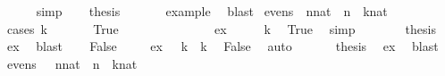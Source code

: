 \begin{isabellebody}
\ \ \ \ \isamarkupfalse%
\ simp\isanewline
\ \ \isamarkupfalse%
\ {\isacharquery}{\kern0pt}thesis\ \isanewline
\ \ \ \ \isamarkupfalse%
\ example\ \isamarkupfalse%
\ blast\isanewline
{}\isamarkupfalse%
%
\endisatagproof
{\isafoldproof}%
%
\isadelimproof
\isanewline
%
\endisadelimproof
\isanewline
{}\isamarkupfalse%
\ {\isachardoublequoteopen}evens{}{\isachardoublequoteclose}{\isacharcolon}{\kern0pt}\ {\isachardoublequoteopen}{\isasymexists}\ {\isacharparenleft}{\kern0pt}n{\isacharcolon}{\kern0pt}{\isacharcolon}{\kern0pt}nat{\isacharparenright}{\kern0pt}\ {\isachardot}{\kern0pt}\ {}{\isacharasterisk}{\kern0pt}n\ {\isachargreater}{\kern0pt}\ {\isacharparenleft}{\kern0pt}k{\isacharcolon}{\kern0pt}{\isacharcolon}{\kern0pt}nat{\isacharparenright}{\kern0pt}{\isachardoublequoteclose}\isanewline
%
\isadelimproof
%
\endisadelimproof
%
\isatagproof
{}\isamarkupfalse%
\ {\isacharparenleft}{\kern0pt}cases\ {\isachardoublequoteopen}k\ {\isacharequal}{\kern0pt}\ {}{\isachardoublequoteclose}{\isacharparenright}{\kern0pt}\ \isanewline
\ \ \isamarkupfalse%
\ True\ \ \ \ \ \ \ \ \ \ \ \isanewline
\ \ \isamarkupfalse%
\ ex{\isacharcolon}{\kern0pt}\ {\isachardoublequoteopen}\ {}\ {\isacharasterisk}{\kern0pt}\ {}\ {\isachargreater}{\kern0pt}\ k{\isachardoublequoteclose}\ \isamarkupfalse%
\ True\ \isamarkupfalse%
\ simp\ \ \isanewline
\ \ \isamarkupfalse%
\ \isamarkupfalse%
\ {\isacharquery}{\kern0pt}thesis\ \isamarkupfalse%
\ ex\ \isamarkupfalse%
\ blast\isanewline
{}\isamarkupfalse%
\isanewline
\ \ \isamarkupfalse%
\ False\ \isanewline
\ \ \isamarkupfalse%
\ ex{\isacharcolon}{\kern0pt}\ {\isachardoublequoteopen}{}\ {\isacharasterisk}{\kern0pt}\ k\ {\isachargreater}{\kern0pt}\ k{\isachardoublequoteclose}\ \isamarkupfalse%
\ False\ \isamarkupfalse%
\ auto\ \isanewline
\ \ \isamarkupfalse%
\ \isamarkupfalse%
\ {\isacharquery}{\kern0pt}thesis\ \isamarkupfalse%
\ ex\ \isamarkupfalse%
\ blast\ \isanewline
{}\isamarkupfalse%
%
\endisatagproof
{\isafoldproof}%
%
\isadelimproof
\isanewline
%
\endisadelimproof
\isanewline
\isanewline
\isanewline
{}\isamarkupfalse%
\ {\isachardoublequoteopen}evens{}{\isachardoublequoteclose}{\isacharcolon}{\kern0pt}\ {\isachardoublequoteopen}\ {\isasymexists}\ {\isacharparenleft}{\kern0pt}n{\isacharcolon}{\kern0pt}{\isacharcolon}{\kern0pt}nat{\isacharparenright}{\kern0pt}\ {\isachardot}{\kern0pt}\ {}{\isacharasterisk}{\kern0pt}n\ {\isachargreater}{\kern0pt}\ {\isacharparenleft}{\kern0pt}k{\isacharcolon}{\kern0pt}{\isacharcolon}{\kern0pt}nat{\isacharparenright}{\kern0pt}{\isachardoublequoteclose}\isanewline

\end{isabellebody}
